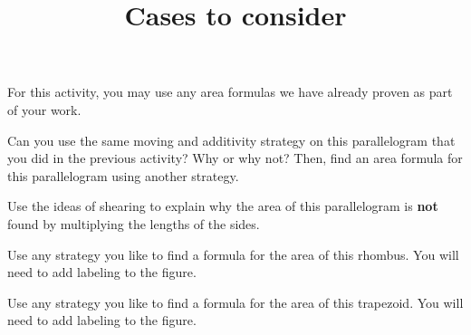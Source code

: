 \documentclass[nooutcomes,noauthor]{ximera}
\title{Cases to consider}
\begin{document}
\begin{abstract}
\end{abstract}

\maketitle

For this activity, you may use any area formulas we have already proven as part of your work.

\begin{problem}
Can you use the same moving and additivity strategy on this parallelogram that you did in the previous activity? Why or why not? Then, find an area formula for this parallelogram using another strategy.

\begin{image}
\end{image}
\end{problem} \vfill

\begin{problem}
Use the ideas of shearing to explain why the area of this parallelogram is {\bf not} found by multiplying the lengths of the sides.

\begin{image}
\end{image}
\end{problem} \vfill

\newpage
\begin{problem}
Use any strategy you like to find a formula for the area of this rhombus. You will need to add labeling to the figure.

\begin{image}
\end{image}
\end{problem} \vfill


\begin{problem}
Use any strategy you like to find a formula for the area of this trapezoid. You will need to add labeling to the figure.

\begin{image}
\end{image}
\end{problem} \vfill
\end{document}
